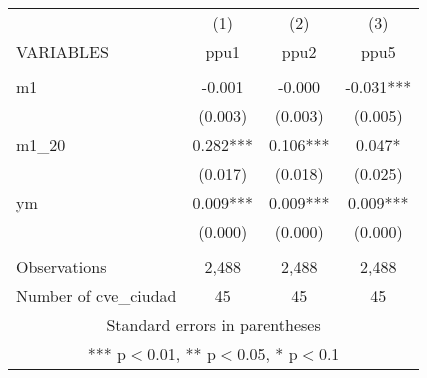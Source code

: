 \begin{tabular}{lccc} \hline
 & (1) & (2) & (3) \\
VARIABLES & ppu1 & ppu2 & ppu5 \\ \hline
 &  &  &  \\
m1 & -0.001 & -0.000 & -0.031*** \\
 & (0.003) & (0.003) & (0.005) \\
m1\_20 & 0.282*** & 0.106*** & 0.047* \\
 & (0.017) & (0.018) & (0.025) \\
ym & 0.009*** & 0.009*** & 0.009*** \\
 & (0.000) & (0.000) & (0.000) \\
 &  &  &  \\
Observations & 2,488 & 2,488 & 2,488 \\
 Number of cve\_ciudad & 45 & 45 & 45 \\ \hline
\multicolumn{4}{c}{ Standard errors in parentheses} \\
\multicolumn{4}{c}{ *** p$<$0.01, ** p$<$0.05, * p$<$0.1} \\
\end{tabular}
